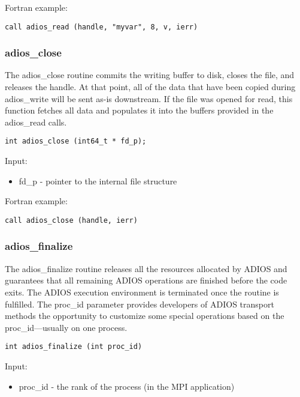 Fortran example: 
\begin{lstlisting}[alsolanguage=Fortran,caption={},label={}]
call adios_read (handle, "myvar", 8, v, ierr)
\end{lstlisting}

\subsubsection{adios\_close}

The adios\_close routine commits the writing buffer to disk, closes 
the file, and releases the handle. At that point, all of the data that have been 
copied during adios\_write will be sent as-is downstream. If the file was opened 
for read, this function fetches all data and populates it into the 
buffers provided in the adios\_read calls. 

\begin{lstlisting}[alsolanguage=C,caption={},label={}]
int adios_close (int64_t * fd_p);
\end{lstlisting}

Input: 
\begin{itemize}
\item fd\_p - pointer to the internal file structure
\end{itemize}

Fortran example: 
\begin{lstlisting}[alsolanguage=Fortran,caption={},label={}]
call adios_close (handle, ierr)
\end{lstlisting}

\subsubsection{adios\_finalize}

The adios\_finalize routine releases all the resources allocated by ADIOS and guarantees 
that all remaining ADIOS operations are finished before the code exits. The ADIOS 
execution environment is terminated once the routine is fulfilled. The proc\_id 
parameter provides developers of ADIOS transport methods the opportunity to customize 
some special operations based on the proc\_id---usually on one process. 

\begin{lstlisting}[alsolanguage=C,caption={},label={}]
int adios_finalize (int proc_id)
\end{lstlisting}

Input: 
\begin{itemize}
\item proc\_id - the rank of the process (in the MPI application)  
\end{itemize}

